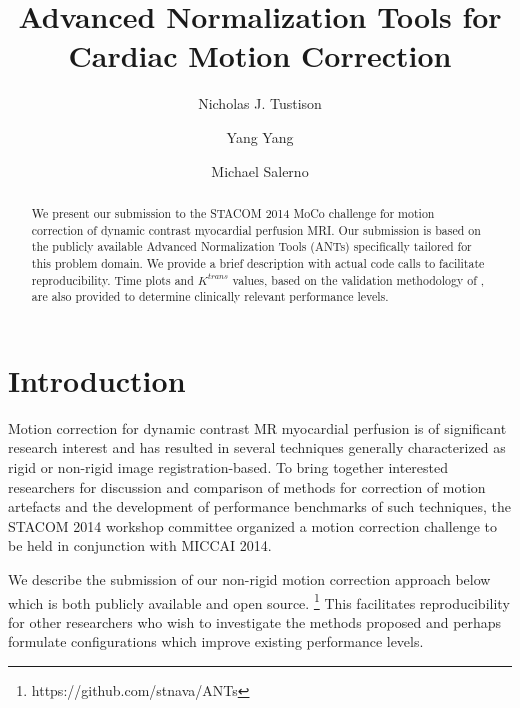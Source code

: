 \documentclass{llncs}
\begin{document}
%
\frontmatter          %
%

\mainmatter              %
%
\title{Advanced Normalization Tools for Cardiac Motion Correction}
%
\titlerunning{}  %
%
\author{Nicholas J. Tustison \and Yang Yang \and Michael Salerno}


\maketitle              %

\begin{abstract}
We present our submission to the STACOM 2014 MoCo challenge for 
motion correction of dynamic contrast myocardial perfusion
MRI.  Our submission is based on the publicly available Advanced
Normalization Tools (ANTs) specifically tailored for this problem
domain.  We provide a brief description with actual code calls
to facilitate reproducibility.  Time plots and $K^{trans}$ values,
based on the validation methodology of \cite{pack2010}, are also provided
to determine clinically relevant performance levels.
\end{abstract}

\section{Introduction}

Motion correction for dynamic contrast MR myocardial perfusion is of significant
research interest and has resulted in several techniques generally characterized as
rigid or non-rigid image registration-based.  To bring together interested 
researchers for discussion and comparison of methods for correction of motion
artefacts and the development of performance benchmarks of such techniques, 
the STACOM 2014 workshop committee organized a motion correction challenge 
to be held in conjunction with MICCAI 2014.

We describe the submission of our non-rigid motion correction approach
below which is both publicly available and open source.%
\footnote{
https://github.com/stnava/ANTs
}
This facilitates 
reproducibility for other researchers who wish to investigate the methods
proposed and perhaps formulate configurations which improve existing
performance levels.
\end{document}
